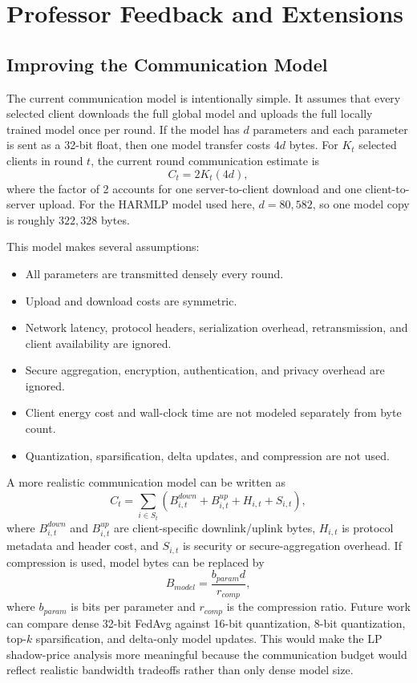 \documentclass{article}
\begin{document}
\section{Professor Feedback and Extensions}
\subsection{Improving the Communication Model}
The current communication model is intentionally simple. It assumes that every selected client downloads the full global model and uploads the full locally trained model once per round. If the model has $d$ parameters and each parameter is sent as a 32-bit float, then one model transfer costs $4d$ bytes. For $K_t$ selected clients in round $t$, the current round communication estimate is
\[
C_t=2K_t(4d),
\]
where the factor of 2 accounts for one server-to-client download and one client-to-server upload. For the HARMLP model used here, $d=80{,}582$, so one model copy is roughly $322{,}328$ bytes.

This model makes several assumptions:
\begin{itemize}
\item All parameters are transmitted densely every round.
\item Upload and download costs are symmetric.
\item Network latency, protocol headers, serialization overhead, retransmission, and client availability are ignored.
\item Secure aggregation, encryption, authentication, and privacy overhead are ignored.
\item Client energy cost and wall-clock time are not modeled separately from byte count.
\item Quantization, sparsification, delta updates, and compression are not used.
\end{itemize}

A more realistic communication model can be written as
\[
C_t=\sum_{i\in S_t}\left(B^{down}_{i,t}+B^{up}_{i,t}+H_{i,t}+S_{i,t}\right),
\]
where $B^{down}_{i,t}$ and $B^{up}_{i,t}$ are client-specific downlink/uplink bytes, $H_{i,t}$ is protocol metadata and header cost, and $S_{i,t}$ is security or secure-aggregation overhead. If compression is used, model bytes can be replaced by
\[
B_{model}=\frac{b_{param}d}{r_{comp}},
\]
where $b_{param}$ is bits per parameter and $r_{comp}$ is the compression ratio. Future work can compare dense 32-bit FedAvg against 16-bit quantization, 8-bit quantization, top-$k$ sparsification, and delta-only model updates. This would make the LP shadow-price analysis more meaningful because the communication budget would reflect realistic bandwidth tradeoffs rather than only dense model size.
\end{document}
